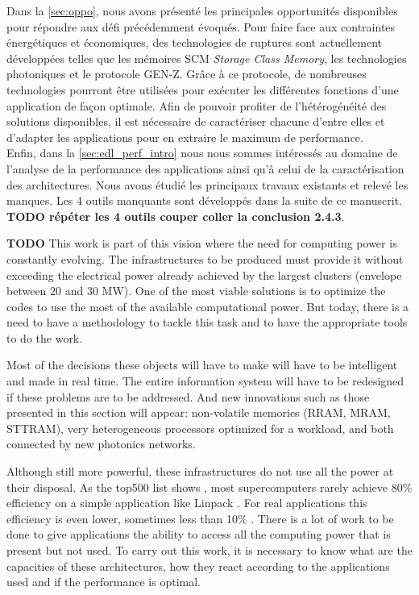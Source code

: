     
    Dans la \autoref{sec:oppo}, nous avons présenté les principales opportunités disponibles pour répondre aux défi précédemment évoqués. Pour faire face aux contraintes énergétiques et économiques, des technologies de ruptures sont actuellement développées telles que les mémoires SCM \textit{Storage Class Memory}, les technologies photoniques et le protocole GEN-Z. Grâce à ce protocole, de nombreuses technologies pourront être utilisées pour exécuter les différentes fonctions d’une application de façon optimale. Afin de pouvoir profiter de l'hétérogénéité des solutions disponibles, il est nécessaire de caractériser chacune d'entre elles et d'adapter les applications pour en extraire le maximum de performance.\\
    
    Enfin, dans la \autoref{sec:edl_perf_intro} nous nous sommes intéressés au domaine de l'analyse de la performance des applications ainsi qu'à celui de la caractérisation des architectures. Nous avons étudié les principaux travaux existants et relevé les manques. Les 4 outils manquants sont développés dans la suite de ce manuscrit.
    \textbf{TODO répéter les 4 outils couper coller la conclusion 2.4.3}.

\iffalse

    
    \textbf{TODO}
    This work is part of this vision where the need for computing power is constantly evolving. The infrastructures to be produced must provide it without exceeding the electrical power already achieved by the largest clusters (envelope between 20 and 30 MW). One of the most viable solutions is to optimize the codes to use the most of the available computational power. But today, there is a need to have a methodology to tackle this task and to have the appropriate tools to do the work.
    
    Most of the decisions these objects will have to make will have to be intelligent and made in real time. The entire information system will have to be redesigned if these problems are to be addressed. And new innovations such as those presented in this section will appear: non-volatile memories (RRAM, MRAM, STTRAM), very heterogeneous processors optimized for a workload, and both connected by new photonics networks.
    
    
    Although still more powerful, these infrastructures do not use all the power at their disposal. As the top500 list shows \cite{Top500}, most supercomputers rarely achieve 80\% efficiency on a simple application like Linpack \cite{Dongarra2003}. For real applications this efficiency is even lower, sometimes less than 10\% \cite{Oliker2005}. There is a lot of work to be done to give applications the ability to access all the computing power that is present but not used. To carry out this work, it is necessary to know what are the capacities of these architectures, how they react according to the applications used and if the performance is optimal.
    

